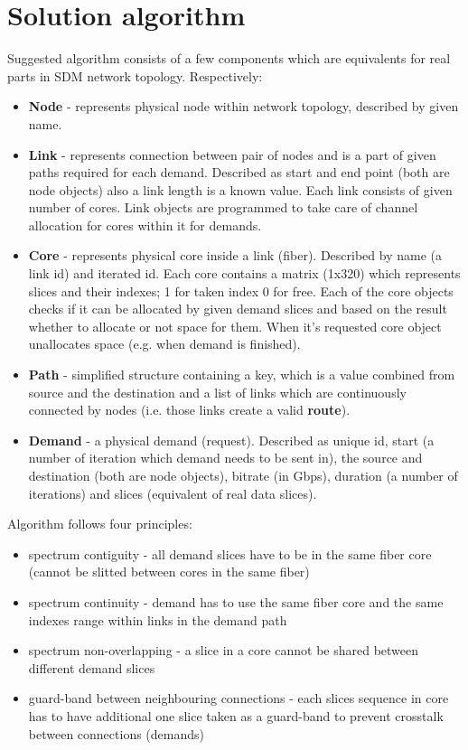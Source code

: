 \documentclass[conference]{IEEEtran}
\begin{document}
\section{Solution algorithm}
Suggested algorithm consists of a few components which are equivalents for real parts in SDM network topology. Respectively:
\begin{itemize}
\item \textbf{Node} - represents physical node within network topology, described by given name.
\item \textbf{Link} - represents connection between pair of nodes and is a part of given paths required for each demand. Described as start and end point (both are node objects) also a link length is a known value. Each link consists of given number of cores. Link objects are programmed to take care of channel allocation for cores within it for demands.
\item \textbf{Core} - represents physical core inside a link (fiber). Described by name (a link id) and iterated id. Each core contains a matrix (1x320) which represents slices and their indexes; 1 for taken index 0 for free. Each of the core objects checks if it can be allocated by given demand slices and based on the result whether to allocate or not space for them. When it's requested core object unallocates space (e.g. when demand is finished).
\item \textbf{Path} - simplified structure containing a key, which is a value combined from source and the destination and a list of links which are continuously connected by nodes (i.e. those links create a valid \textbf{route}).
\item \textbf{Demand} - a physical demand (request). Described as unique id, start (a number of iteration which demand needs to be sent in), the source and destination (both are node objects), bitrate (in Gbps), duration (a number of iterations) and slices (equivalent of real data slices).
\end{itemize}
Algorithm follows four principles:
\begin{itemize}
\item spectrum contiguity - all demand slices have to be in the same fiber core (cannot be slitted between cores in the same fiber)
\item spectrum continuity - demand has to use the same fiber core and the same indexes range within links in the demand path
\item spectrum non-overlapping - a slice in a core cannot be shared between different demand slices
\item guard-band between neighbouring connections - each slices sequence in core has to have additional one slice taken as a guard-band to prevent crosstalk between connections (demands)
\end{itemize}
\end{document}

